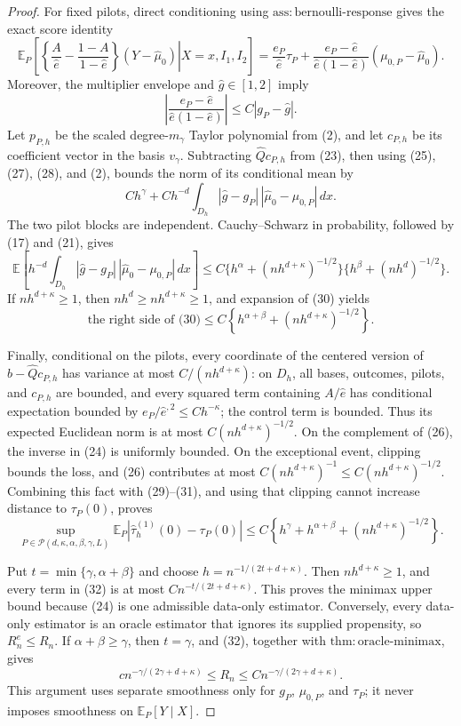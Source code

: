 \documentclass{article}
\begin{document}
\begin{proof}
For fixed pilots, direct conditioning using \(\mathrm{ass:bernoulli\mbox{-}response}\) gives the exact score identity
\[
 \mathbb E_P\!\left[\left.
 \left\{\frac A{\widehat e}-\frac{1-A}{1-\widehat e}\right\}(Y-\widehat\mu_0)
 \right|X=x,I_1,I_2\right]
 =\frac{e_P}{\widehat e}\tau_P
 +\frac{e_P-\widehat e}{\widehat e(1-\widehat e)}(\mu_{0,P}-\widehat\mu_0). \tag{27}
\]
Moreover, the multiplier envelope and \(\widehat g\in[1,2]\) imply
\[
 \left|\frac{e_P-\widehat e}{\widehat e(1-\widehat e)}\right|
 \le C|g_P-\widehat g|. \tag{28}
\]
Let \(p_{P,h}\) be the scaled degree-\(m_\gamma\) Taylor polynomial from (2), and let \(c_{P,h}\) be its coefficient vector in the basis \(v_\gamma\).  Subtracting \(\widehat Qc_{P,h}\) from (23), then using (25), (27), (28), and (2), bounds the norm of its conditional mean by
\[
 C h^\gamma+C h^{-d}\int_{D_h}|\widehat g-g_P|\,|\widehat\mu_0-\mu_{0,P}|\,dx. \tag{29}
\]
The two pilot blocks are independent.  Cauchy--Schwarz in probability, followed by (17) and (21), gives
\[
 \mathbb E\!\left[h^{-d}\int_{D_h}|\widehat g-g_P|\,|\widehat\mu_0-\mu_{0,P}|\,dx\right]
 \le C\{h^\alpha+(nh^{d+\kappa})^{-1/2}\}
       \{h^\beta+(nh^d)^{-1/2}\}. \tag{30}
\]
If \(nh^{d+\kappa}\ge1\), then \(nh^d\ge nh^{d+\kappa}\ge1\), and expansion of (30) yields
\[
 \text{the right side of (30)}
 \le C\left\{h^{\alpha+\beta}+(nh^{d+\kappa})^{-1/2}\right\}. \tag{31}
\]

Finally, conditional on the pilots, every coordinate of the centered version of \(\widehat b-\widehat Qc_{P,h}\) has variance at most \(C/(nh^{d+\kappa})\): on \(D_h\), all bases, outcomes, pilots, and \(c_{P,h}\) are bounded, and every squared term containing \(A/\widehat e\) has conditional expectation bounded by \(e_P/\widehat e^{,2}\le Ch^{-\kappa}\); the control term is bounded.  Thus its expected Euclidean norm is at most \(C(nh^{d+\kappa})^{-1/2}\).  On the complement of (26), the inverse in (24) is uniformly bounded.  On the exceptional event, clipping bounds the loss, and (26) contributes at most \(C(nh^{d+\kappa})^{-1}\le C(nh^{d+\kappa})^{-1/2}\).  Combining this fact with (29)--(31), and using that clipping cannot increase distance to \(\tau_P(0)\), proves
\[
 \sup_{P\in\mathcal P(d,\kappa,\alpha,\beta,\gamma,L)}
 \mathbb E_P|\widehat\tau_h^{(1)}(0)-\tau_P(0)|
 \le C\left\{h^\gamma+h^{\alpha+\beta}+(nh^{d+\kappa})^{-1/2}\right\}. \tag{32}
\]

Put \(t=\min\{\gamma,\alpha+\beta\}\) and choose \(h=n^{-1/(2t+d+\kappa)}\).  Then \(nh^{d+\kappa}\ge1\), and every term in (32) is at most \(Cn^{-t/(2t+d+\kappa)}\).  This proves the minimax upper bound because (24) is one admissible data-only estimator.  Conversely, every data-only estimator is an oracle estimator that ignores its supplied propensity, so \(R_n^e\le R_n\).  If \(\alpha+\beta\ge\gamma\), then \(t=\gamma\), and (32), together with \(\mathrm{thm:oracle\mbox{-}minimax}\), gives
\[
 c n^{-\gamma/(2\gamma+d+\kappa)}\le R_n\le C n^{-\gamma/(2\gamma+d+\kappa)}.
\]
This argument uses separate smoothness only for \(g_P\), \(\mu_{0,P}\), and \(\tau_P\); it never imposes smoothness on \(\mathbb E_P[Y\mid X]\).
\end{proof}
\end{document}
